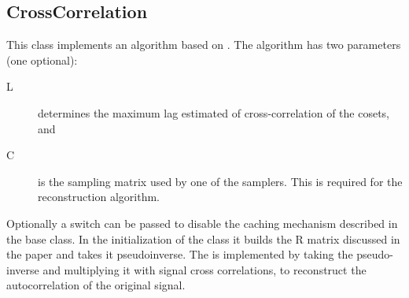 \documentclass[a4paper, openany, oneside]{memoir}
\begin{document}
\subsection{CrossCorrelation}
\label{sub:crosscorrelation}
This class implements an algorithm based on \cite{ariananda2012compressive}. The algorithm has two parameters (one optional):
\begin{description}
    \item[L] determines the maximum lag estimated of cross-correlation of the cosets, and
    \item[C] is the sampling matrix used by one of the samplers. This is required for the reconstruction algorithm.
\end{description}
Optionally a switch can be passed to disable the caching mechanism described in the base class. In the initialization of the class it builds the R matrix discussed in the paper and takes it pseudoinverse. The  is implemented by taking the pseudo-inverse and multiplying it with signal cross correlations, to reconstruct the autocorrelation of the original signal.
\end{document}
